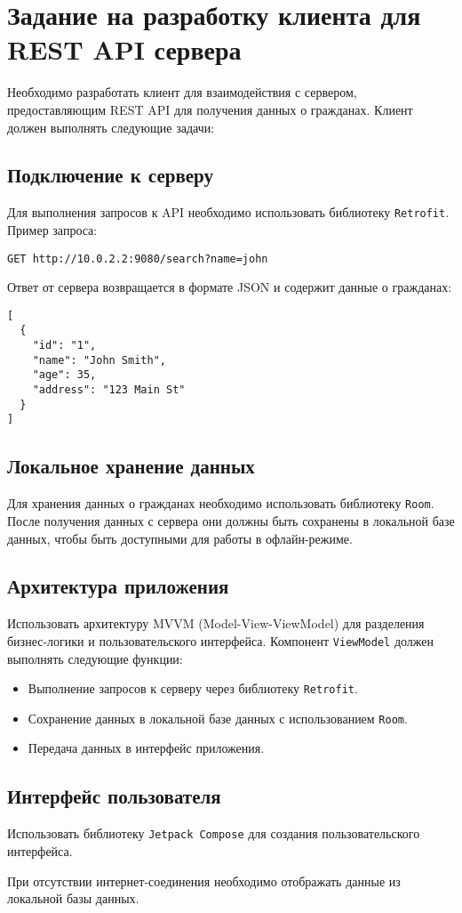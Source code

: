 \section{Задание на разработку клиента для REST API сервера}

Необходимо разработать клиент для взаимодействия с сервером, предоставляющим REST API для получения данных о гражданах. Клиент должен выполнять следующие задачи:

\subsection{Подключение к серверу}

Для выполнения запросов к API необходимо использовать библиотеку \texttt{Retrofit}. Пример запроса:

\begin{verbatim}
GET http://10.0.2.2:9080/search?name=john
\end{verbatim}

Ответ от сервера возвращается в формате JSON и содержит данные о гражданах:

\begin{verbatim}
[
  {
    "id": "1",
    "name": "John Smith",
    "age": 35,
    "address": "123 Main St"
  }
]
\end{verbatim}

\subsection{Локальное хранение данных}
Для хранения данных о гражданах необходимо использовать библиотеку \texttt{Room}. После получения данных с сервера они должны быть сохранены в локальной базе данных, чтобы быть доступными для работы в офлайн-режиме.

\subsection{Архитектура приложения}
Использовать архитектуру MVVM (Model-View-ViewModel) для разделения бизнес-логики и пользовательского интерфейса. Компонент \texttt{ViewModel} должен выполнять следующие функции:
\begin{itemize}
    \item Выполнение запросов к серверу через библиотеку \texttt{Retrofit}.
    \item Сохранение данных в локальной базе данных с использованием \texttt{Room}.
    \item Передача данных в интерфейс приложения.
\end{itemize}

\subsection{Интерфейс пользователя}
Использовать библиотеку \texttt{Jetpack Compose} для создания пользовательского интерфейса.

При отсутствии интернет-соединения необходимо отображать данные из локальной базы данных.
